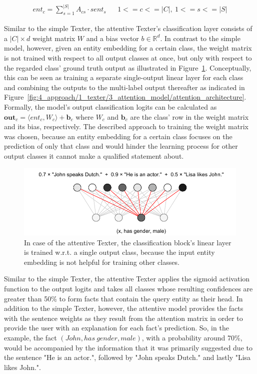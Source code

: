 \begin{align}
    ent_c = \sum_{s = 1}^{|S|} A_{cs} \cdot sent_s && 1 <= c <= |C|,~1 <= s <= |S|
    \label{eq:4_approach/1_texter/3_attention_model/ent_emb}
\end{align}

Similar to the simple Texter, the attentive Texter's classification layer consists of a $|C| \times d$ weight matrix $W$ and a bias vector $b \in \mathbb{R}^d$. In contrast to the simple model, however, given an entity embedding for a certain class, the weight matrix is not trained with respect to all output classes at once, but only with respect to the regarded class' ground truth output as illustrated in Figure~\ref{fig:4_approach/1_texter/3_attention_model/multi_linear}.  Conceptually, this can be seen as training a separate single-output linear layer for each class and combining the outputs to the multi-label output thereafter as indicated in Figure~\ref{fig:4_approach/1_texter/3_attention_model/attention_architecture}. Formally, the model's output classification logits can be calculated as $\textbf{out}_c = \langle ent_c, W_c \rangle + \textbf{b}_c$ where $W_c$ and $\textbf{b}_c$ are the class' row in the weight matrix and its bias, respectively. The described approach to training the weight matrix was chosen, because an entity embedding for a certain class focuses on the prediction of only that class and would hinder the learning process for other output classes it cannot make a qualified statement about.

\begin{figure}[t]
    \centering
    \includegraphics{4_approach/1_texter/3_attention_model/multi_linear}
    \caption{In case of the attentive Texter, the classification block's linear layer is trained w.r.t. a single output class, because the input entity embedding is not helpful for training other classes.}
    \label{fig:4_approach/1_texter/3_attention_model/multi_linear}
\end{figure}

Similar to the simple Texter, the attentive Texter applies the sigmoid activation function to the output logits and takes all classes whose resulting confidences are greater than 50\% to form facts that contain the query entity as their head. In addition to the simple Texter, however, the attentive model provides the facts with the sentence weights as they result from the attention matrix in order to provide the user with an explanation for each fact's prediction. So, in the example, the fact $(John, has~gender, male)$, with a probability around 70\%, would be accompanied by the information that it was primarily suggested due to the sentence "He is an actor.", followed by "John speaks Dutch." and lastly "Lisa likes John.".
